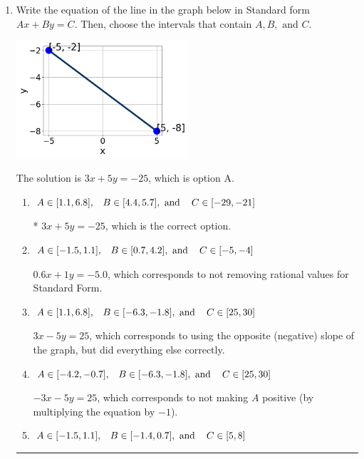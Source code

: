 \documentclass{extbook}[14pt]
\newcommand{\litem}[1]{\item #1

\rule{\textwidth}{0.4pt}}
\begin{document}
\begin{enumerate}\litem{
Write the equation of the line in the graph below in Standard form $Ax+By=C$. Then, choose the intervals that contain $A, B, \text{ and } C$.

\begin{center}
    \includegraphics[width=0.5\textwidth]{../Figures/linearGraphToStandardA.png}
\end{center}




The solution is \( 3x + 5y = -25 \), which is option A.\begin{enumerate}[label=\Alph*.]
\item \( A \in [1.1, 6.8], \hspace{3mm} B \in [4.4, 5.7], \text{ and } \hspace{3mm} C \in [-29, -21] \)

* $3x + 5y = -25$, which is the correct option.
\item \( A \in [-1.5, 1.1], \hspace{3mm} B \in [0.7, 4.2], \text{ and } \hspace{3mm} C \in [-5, -4] \)

 $0.6x + 1y = -5.0$, which corresponds to not removing rational values for Standard Form.
\item \( A \in [1.1, 6.8], \hspace{3mm} B \in [-6.3, -1.8], \text{ and } \hspace{3mm} C \in [25, 30] \)

 $3x - 5y = 25$, which corresponds to using the opposite (negative) slope of the graph, but did everything else correctly.
\item \( A \in [-4.2, -0.7], \hspace{3mm} B \in [-6.3, -1.8], \text{ and } \hspace{3mm} C \in [25, 30] \)

 $-3x - 5y = 25$, which corresponds to not making $A$ positive (by multiplying the equation by $-1$).
\item \( A \in [-1.5, 1.1], \hspace{3mm} B \in [-1.4, 0.7], \text{ and } \hspace{3mm} C \in [5, 8] \)


\end{enumerate}}
\end{enumerate}
\end{document}
